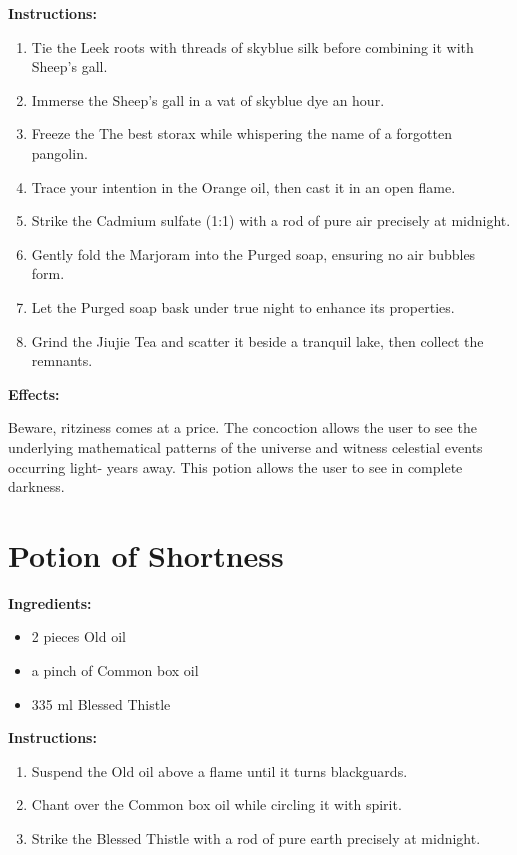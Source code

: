 \documentclass{article}
\begin{document}
\textbf{Instructions:}

\begin{enumerate}
  \item Tie the Leek roots with threads of skyblue silk before combining it with Sheep's gall.
  \item Immerse the Sheep's gall in a vat of skyblue dye an hour.
  \item Freeze the The best storax while whispering the name of a forgotten pangolin.
  \item Trace your intention in the Orange oil, then cast it in an open flame.
  \item Strike the Cadmium sulfate (1:1) with a rod of pure air precisely at midnight.
  \item Gently fold the Marjoram into the Purged soap, ensuring no air bubbles form.
  \item Let the Purged soap bask under true night to enhance its properties.
  \item Grind the Jiujie Tea and scatter it beside a tranquil lake, then collect the remnants.
\end{enumerate}

\textbf{Effects:}

Beware, ritziness comes at a price. The concoction allows the user to see the underlying mathematical patterns of the universe and witness celestial events occurring light- years away. This potion allows the user to see in complete darkness.

\newpage
\section*{Potion of Shortness}

\textbf{Ingredients:}

\begin{itemize}
  \item 2 pieces Old oil
  \item a pinch of Common box oil
  \item 335 ml Blessed Thistle
\end{itemize}

\textbf{Instructions:}

\begin{enumerate}
  \item Suspend the Old oil above a flame until it turns blackguards.
  \item Chant over the Common box oil while circling it with spirit.
  \item Strike the Blessed Thistle with a rod of pure earth precisely at midnight.
\end{enumerate}
\end{document}
